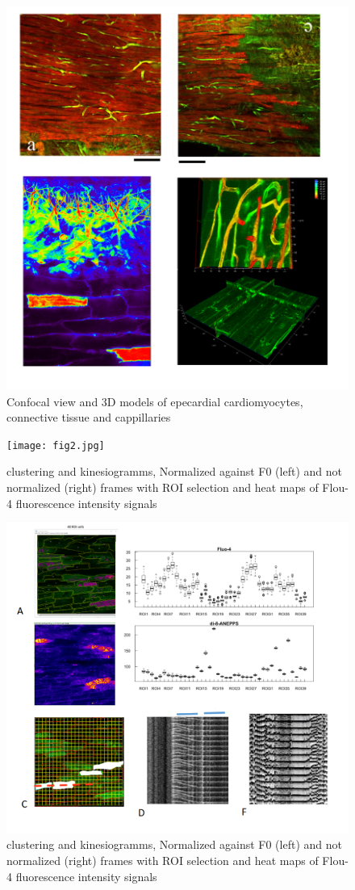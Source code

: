 \documentclass{biophys-new}
\begin{document}
\begin{figure}[hbt!]
\centering
\includegraphics[width=0.8\linewidth]{fig1.png}
\caption{Confocal view and 3D models of epecardial cardiomyocytes, connective tissue and cappillaries}
\label{fig:fig1}
\end{figure}


\begin{figure}
    \texttt{[image: fig2.jpg]}
    \caption{clustering and kinesiogramms, Normalized against F0 (left) and not normalized (right) frames with ROI selection and heat maps of Flou-4 fluorescence intensity signals }
    \label{fig:fig2}
\end{figure}


\begin{figure}
    \includegraphics[width=0.8\linewidth]{fig3.png}
    \caption{clustering and kinesiogramms, Normalized against F0 (left) and not normalized (right) frames with ROI selection and heat maps of Flou-4 fluorescence intensity signals }
    \label{fig:fig3}
\end{figure}
\end{document}
